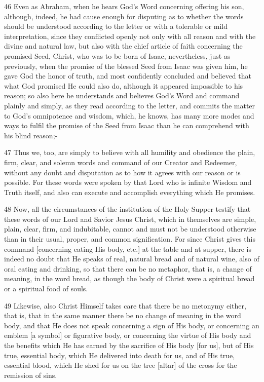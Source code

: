 46 Even as Abraham, when he hears God’s Word concerning offering his son, although, indeed, he had cause enough for disputing as to whether the words should be understood according to the letter or with a tolerable or mild interpretation, since they conflicted openly not only with all reason and with the divine and natural law, but also with the chief article of faith concerning the promised Seed, Christ, who was to be born of Isaac, nevertheless, just as previously, when the promise of the blessed Seed from Isaac was given him, he gave God the honor of truth, and most confidently concluded and believed that what God promised He could also do, although it appeared impossible to his reason; so also here he understands and believes God’s Word and command plainly and simply, as they read according to the letter, and commits the matter to God’s omnipotence and wisdom, which, he knows, has many more modes and ways to fulfil the promise of the Seed from Isaac than he can comprehend with his blind reason;-

47 Thus we, too, are simply to believe with all humility and obedience the plain, firm, clear, and solemn words and command of our Creator and Redeemer, without any doubt and disputation as to how it agrees with our reason or is possible. For these words were spoken by that Lord who is infinite Wisdom and Truth itself, and also can execute and accomplish everything which He promises.

48 Now, all the circumstances of the institution of the Holy Supper testify that these words of our Lord and Savior Jesus Christ, which in themselves are simple, plain, clear, firm, and indubitable, cannot and must not be understood otherwise than in their usual, proper, and common signification. For since Christ gives this command [concerning eating His body, etc.] at the table and at supper, there is indeed no doubt that He speaks of real, natural bread and of natural wine, also of oral eating and drinking, so that there can be no metaphor, that is, a change of meaning, in the word bread, as though the body of Christ were a spiritual bread or a spiritual food of souls.

49 Likewise, also Christ Himself takes care that there be no metonymy either, that is, that in the same manner there be no change of meaning in the word body, and that He does not speak concerning a sign of His body, or concerning an emblem [a symbol] or figurative body, or concerning the virtue of His body and the benefits which He has earned by the sacrifice of His body [for us], but of His true, essential body, which He delivered into death for us, and of His true, essential blood, which He shed for us on the tree [altar] of the cross for the remission of sins.

